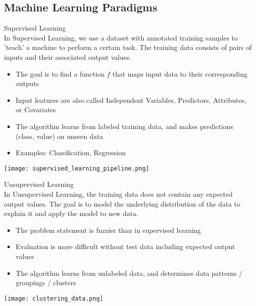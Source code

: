 \multend

\raggedcolumns
\columnbreak

\subsection{Machine Learning Paradigms}

\begin{concept}{Supervised Learning}\\
    In Supervised Learning, we use a dataset with annotated training samples to 'teach' a machine to perform a certain task. The training data consists of pairs of inputs and their associated output values.
    \begin{itemize}
        \item The goal is to find a function $f$ that maps input data to their corresponding outputs
        \item Input features are also called Independent Variables, Predictors, Attributes, or Covariates
        \item The algorithm learns from labeled training data, and makes predictions (class, value) on unseen data
        \item Examples: Classification, Regression
    \end{itemize}

    \texttt{[image: supervised\_learning\_pipeline.png]}
\end{concept}

\begin{concept}{Unsupervised Learning}\\
    In Unsupervised Learning, the training data does not contain any expected output values. The goal is to model the underlying distribution of the data to explain it and apply the model to new data.
    \begin{itemize}
        \item The problem statement is fuzzier than in supervised learning
        \item Evaluation is more difficult without test data including expected output values
        \item The algorithm learns from unlabeled data, and determines data patterns / groupings / clusters
    \end{itemize}

    \texttt{[image: clustering\_data.png]}
\end{concept}

